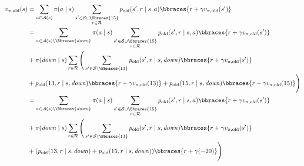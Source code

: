 \begin{solution}
\begin{enumerate}[label = \arabic*.]
    \begin{align*}
        v_{\pi, \text{old}}(s)
        & =
        \sum_{a \in \mathcal A(s)}
            \pi(a \mid s)
            \sum_{\substack{s^\prime \in \mathcal S \cup \Bbraces{15} \\ r \in \mathcal R}}
                p_\text{old}(s^\prime, r \mid s, a)
                \bbraces{r + \gamma v_{\pi, \text{old}}(s^\prime)} \\
        & =
        \sum_{a \in \mathcal A(s) \setminus \Bbraces{\mathit{down}}}
            \pi(a \mid s)
            \sum_{\substack{s^\prime \in \mathcal S \cup \Bbraces{15} \\ r \in \mathcal R}}
                p_\text{old}(s^\prime, r \mid s, a)
                \bbraces{r + \gamma v_{\pi, \text{old}}(s^\prime)} \\
        & +
        \pi(\mathit{down} \mid s)
        \sum_{r \in \mathcal R}
            \Bigg (
                \sum_{s^\prime \in \mathcal S \setminus \Bbraces{13}}
                    p_\text{old}(s^\prime, r \mid s, \mathit{down})
                    \bbraces{r + \gamma v_{\pi, \text{old}}(s^\prime)} \\
                & +
                p_\text{old}(13, r \mid s, \mathit{down})
                \bbraces{r + \gamma v_{\pi, \text{old}}(13)}
                +
                p_\text{old}(15, r \mid s, \mathit{down})
                \bbraces{r + \gamma v_{\pi, \text{old}}(15)}
            \Bigg ) \\
        & =
        \sum_{a \in \mathcal A(s) \setminus \Bbraces{\mathit{down}}}
            \pi(a \mid s)
            \sum_{\substack{s^\prime \in \mathcal S \cup \Bbraces{15} \\ r \in \mathcal R}}
                p_\text{old}(s^\prime, r \mid s, a)
                \bbraces{r + \gamma v_{\pi, \text{old}}(s^\prime)} \\
        & +
        \pi(\mathit{down} \mid s)
        \sum_{r \in \mathcal R}
            \Bigg (
                \sum_{s^\prime \in \mathcal S \setminus \Bbraces{13}}
                    p_\text{old}(s^\prime, r \mid s, \mathit{down})
                    \bbraces{r + \gamma v_{\pi, \text{old}}(s^\prime)} \\
                & +
                (
                    p_\text{old}(13, r \mid s, \mathit{down})
                    +
                    p_\text{old}(15, r \mid s, \mathit{down})
                )
                \bbraces{r + \gamma (-20)}
            \Bigg ) \\

\end{align*}
\end{enumerate}
\end{solution}
